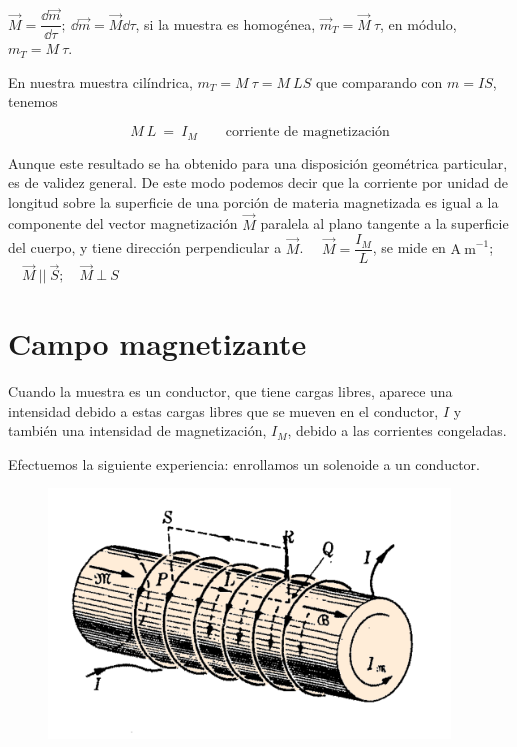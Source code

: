 $\vec M = \dfrac{\dd \vec m}{\dd \tau}; \ \dd \vec m = \vec M \dd \tau$, si la muestra es homogénea, $\vec m_T=\vec M \ \tau$, en módulo,  $ m_T=M \ \tau$.

En nuestra muestra cilíndrica, $ m_T=M \ \tau = M\ LS$ que comparando con $m=IS$, tenemos

\begin{equation}
M\ L \ = \ I_M \qquad \text{corriente de magnetización} 	
\end{equation}


Aunque este resultado se ha obtenido para una disposición geométrica particular, es de validez general. De este modo podemos decir que
la corriente por unidad de longitud sobre la superficie de una porción de materia magnetizada es igual a la componente del vector magnetización $\vec M$ paralela al plano tangente a la superficie del cuerpo, y tiene dirección perpendicular a $\vec M$.
$\quad \vec M=\dfrac {I_M} L$, se mide en $\mathrm{A\ m}^{-1}$; $\quad \vec M \ || \ \vec S;\quad \vec M \ \bot \ S$

\section{Campo magnetizante}

Cuando la muestra es un conductor, que tiene cargas libres, aparece una intensidad debido a estas cargas libres que se mueven en el conductor, $I$ y también una intensidad de magnetización, $I_M$, debido a las corrientes congeladas.

Efectuemos la siguiente experiencia: enrollamos un solenoide a un conductor.

\begin{figure}[H]
	\centering
	\includegraphics[width=0.95\textwidth]{imagenes/imagenes27/T27IM10.png}
\end{figure}

